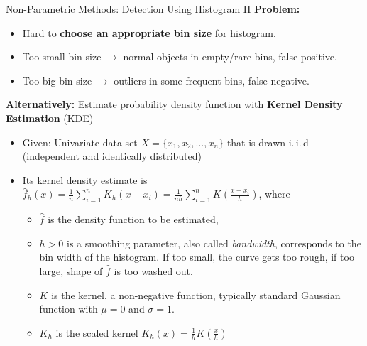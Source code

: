 \begin{frame}{Non-Parametric Methods: Detection Using Histogram II}
	\textbf{Problem:}
	\begin{itemize}
		\item Hard to \textbf{\color{airforceblue}choose an appropriate bin size} for histogram.
		\item Too small bin size $\rightarrow$ normal objects in empty/rare bins, false positive.
		\item Too big bin size $\rightarrow$ outliers in some frequent bins, false negative.
	\end{itemize}
	\vspace*{1em}
	\textbf{Alternatively:} Estimate probability density function with \textbf{Kernel Density Estimation} (KDE)
	\begin{itemize}
		\item Given: Univariate data set $X=\{x_1, x_2, \dots, x_n\}$ that is drawn i.\,i.\,d (independent and identically distributed)
		\item Its \underline{kernel density estimate} is $\hat{f}_h(x)=\frac{1}{n}\sum_{i=1}^n K_h(x-x_i) = \frac{1}{nh}\sum_{i=1}^n K(\frac{x-x_i}{h})$, where
		      \begin{itemize}
			      \item $\hat{f}$ is the density function to be estimated,
			      \item $h>0$ is a smoothing parameter, also called \textit{bandwidth}, corresponds to the bin width of the histogram. If too small, the curve gets too rough, if too large, shape of $\hat{f}$ is too washed out.
			      \item $K$ is the kernel, a non-negative function, typically standard Gaussian function with $\mu=0$ and $\sigma=1$.
			      \item $K_h$ is the scaled kernel $K_h(x)=\frac{1}{h} K(\frac{x}{h})$
		      \end{itemize}
	\end{itemize}
\end{frame}
